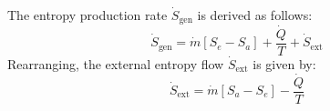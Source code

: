 The entropy production rate \( \dot{S}_{\text{gen}} \) is derived as follows:  
\[
\dot{S}_{\text{gen}} = \dot{m} \left[ S_e - S_a \right] + \frac{\dot{Q}}{T} + \dot{S}_{\text{ext}}
\]  
Rearranging, the external entropy flow \( \dot{S}_{\text{ext}} \) is given by:  
\[
\dot{S}_{\text{ext}} = \dot{m} \left[ S_a - S_e \right] - \frac{\dot{Q}}{T}
\]